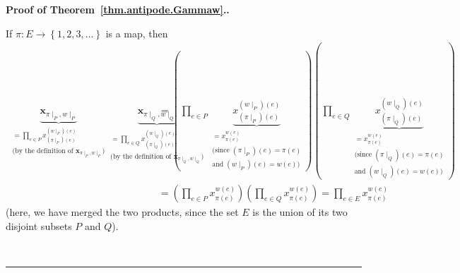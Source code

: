 \documentclass[numbers=enddot,12pt,final,onecolumn,notitlepage,abstracton]{scrartcl}
\theoremstyle{definition}
\newenvironment{proof}[1][Proof]{\noindent\textbf{#1.} }{\ \rule{0.5em}{0.5em}}
\let\prodnonlimits\prod
\renewcommand{\prod}{\prodnonlimits\limits}
\newenvironment{verlong}{}{}
\newcommand{\xx}{{\mathbf{x}}}
\begin{document}
\begin{proof}[Proof of Theorem~\ref{thm.antipode.Gammaw}.]
\begin{verlong}
{If $\pi:E\rightarrow\left\{  1,2,3,\ldots\right\}  $ is a map, then
\begin{align*}
\underbrace{\xx_{\pi\mid_{P},w\mid_{P}}}_{\substack{
=\prod_{e\in P}x_{\left(
\pi\mid_{P}\right)  \left(  e\right)  }^{\left(  w\mid_{P} \right)
\left(  e\right) }  \\
\text{(by the definition of } \xx_{\pi\mid_P, w\mid_P} \text{)}
}}
\underbrace{\xx_{\pi\mid_{Q},w\mid_{Q}}}_{\substack{
=\prod_{e\in Q}x_{\left(  \pi\mid_{Q}\right)  \left(  e\right)  }^{
\left(  w\mid_{Q} \right) \left(e\right) } \\
\text{(by the definition of } \xx_{\pi\mid_Q, w\mid_Q} \text{)}
}}
& =\left(  \prod_{e\in P}\underbrace{x_{\left(  \pi\mid_{P}\right)  \left(
e\right)  }^{\left(  w\mid_{P}  \right) \left(  e\right) }}_{\substack{=x_{\pi
\left(  e\right)  }^{w\left(  e\right)  }\\\text{(since }\left(  \pi\mid
_{P}\right)  \left(  e\right)  =\pi\left(  e\right)  \\\text{and }\left(
w\mid_{P} \right) \left(  e\right) =w\left(  e\right)  \text{)}}}\right)
\left(  \prod_{e\in Q}\underbrace{x_{\left(  \pi\mid_{Q}\right)  \left(
e\right)  }^{\left(  w\mid_{Q} \right) \left(  e\right) }}_{\substack{=x_{\pi
\left(  e\right)  }^{w\left(  e\right)  }\\\text{(since }\left(  \pi\mid
_{Q}\right)  \left(  e\right)  =\pi\left(  e\right)  \\\text{and }\left(
w\mid_{Q} \right) \left(  e\right)  =w\left(  e\right)  \text{)}}}\right)  \\
& =\left(  \prod_{e\in P}x_{\pi\left(  e\right)  }^{w\left(  e\right)
}\right)  \left(  \prod_{e\in Q}x_{\pi\left(  e\right)  }^{w\left(  e\right)
}\right)  =\prod_{e\in E}x_{\pi\left(  e\right)  }^{w\left(  e\right)  }%
\end{align*}
(here, we have merged the two products, since the set $E$ is the union of its
two disjoint subsets $P$ and $Q$).

}
\end{verlong}
\end{proof}
\end{document}
